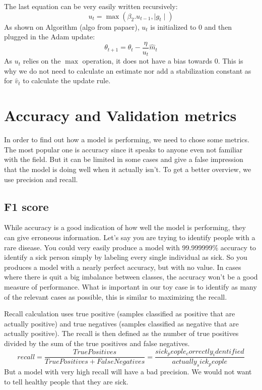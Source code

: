 The last equation can be very easily written recursively: 
\[ u_t = \max(\beta_2 . u_{t-1},  \mid g_t\mid)\]
As shown on Algorithm (algo from papaer), \(u_t\) is initialized to 0 and then plugged in the Adam update: 
\[\theta_{t+1} = \theta_t - \frac{\eta}{u_t} \hat{m}_t\]
As \(u_t\) relies on the \(\max\) operation, it does not have a bias towards 0. This is why we do not need to calculate an estimate nor add a stabilization constant as for \(\hat{v}_t\) to calculate the update rule.

\section{Accuracy and Validation metrics}
In order to find out how a model is performing, we need to chose some metrics. The most popular one is accuracy since it speaks to anyone even not familiar with the field. But it can be limited in some cases and give a false impression that the model is doing well when it actually isn't. To get a better overview, we use precision and recall. 

\subsection{F1 score}
While accuracy is a good indication of how well the model is performing, they can give erroneous information. Let's say you are trying to identify people with a rare disease. You could very easily produce a model with 99.999999\% accuracy to identify a sick person simply by labeling every single individual as sick. So you produces a model with a nearly perfect accuracy, but with no value. In cases where there is quit a big imbalance between classes, the accuracy won't be a good measure of performance.
What is important in our toy case is to identify as many of the relevant cases as possible, this is similar to maximizing the recall. 

Recall calculation uses true positive (samples classified as positive that are actually positive) and true negatives (samples classified as negative that are actually positive). The recall is then defined as the number of true positives divided by the sum of the true positives and false negatives. 
\[recall = \frac{True Positives}{True Positives + False Negatives} = \frac{sick_people_correctly_identified}{actually_sick_people}\]
But a model with very high recall will have a bad precision. We would not want to tell healthy people that they are sick. 

